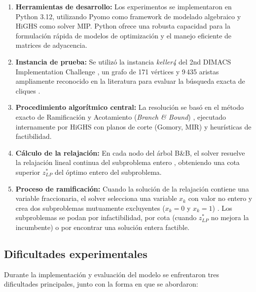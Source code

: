 \begin{enumerate}
    \item \textbf{Herramientas de desarrollo:} Los experimentos se implementaron en Python 3.12, utilizando Pyomo \parencite{pyomo2021} como framework de modelado algebraico y HiGHS \parencite{highs2024} como solver MIP. Python ofrece una robusta capacidad para la formulación rápida de modelos de optimización y el manejo eficiente de matrices de adyacencia.

    \item \textbf{Instancia de prueba:} Se utilizó la instancia \textit{keller4} del 2nd DIMACS Implementation Challenge \parencite{dimacs1993, mascia_dimacs}, un grafo de 171 vértices y 9\,435 aristas ampliamente reconocido en la literatura para evaluar la búsqueda exacta de cliques \parencite{pardalos1992}.

    \item \textbf{Procedimiento algorítmico central:} La resolución se basó en el método exacto de Ramificación y Acotamiento (\textit{Branch \& Bound}) \parencite{carraghan1990, pardalos1992}, ejecutado internamente por HiGHS con planos de corte (Gomory, MIR) y heurísticas de factibilidad.

    \item \textbf{Cálculo de la relajación:} En cada nodo del árbol B\&B, el solver resuelve la relajación lineal continua del subproblema entero \parencite{nemhauser1988}, obteniendo una cota superior $z^*_{LP}$ del óptimo entero del subproblema.

    \item \textbf{Proceso de ramificación:} Cuando la solución de la relajación contiene una variable fraccionaria, el solver selecciona una variable $x_k$ con valor no entero y crea dos subproblemas mutuamente excluyentes ($x_k = 0$ y $x_k = 1$) \parencite{carraghan1990, nemhauser1988}. Los subproblemas se podan por infactibilidad, por cota (cuando $z^*_{LP}$ no mejora la incumbente) o por encontrar una solución entera factible.
\end{enumerate}

\subsection{Dificultades experimentales}\label{subsec:dificultades}

Durante la implementación y evaluación del modelo se enfrentaron tres dificultades principales, junto con la forma en que se abordaron:

